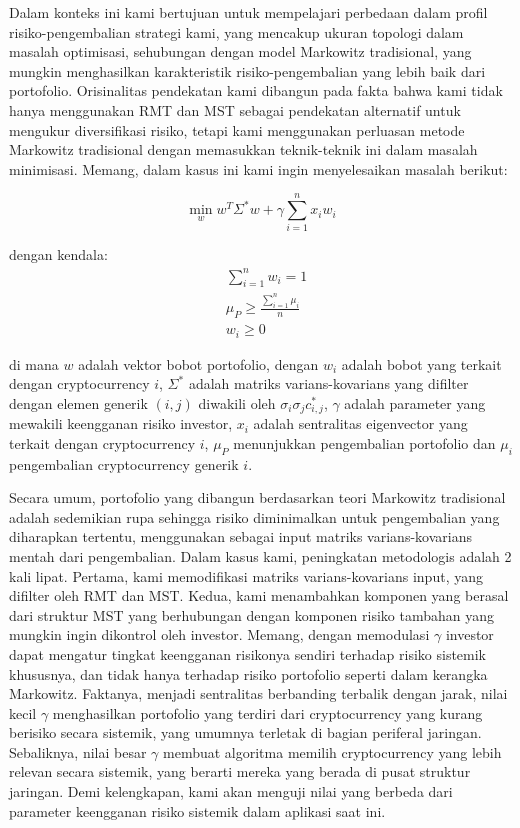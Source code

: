 \documentclass[12pt,a4paper]{article}
\begin{document}
Dalam konteks ini kami bertujuan untuk mempelajari perbedaan dalam profil risiko-pengembalian strategi kami, yang mencakup ukuran topologi dalam masalah optimisasi, sehubungan dengan model Markowitz tradisional, yang mungkin menghasilkan karakteristik risiko-pengembalian yang lebih baik dari portofolio. Orisinalitas pendekatan kami dibangun pada fakta bahwa kami tidak hanya menggunakan RMT dan MST sebagai pendekatan alternatif untuk mengukur diversifikasi risiko, tetapi kami menggunakan perluasan metode Markowitz tradisional dengan memasukkan teknik-teknik ini dalam masalah minimisasi. Memang, dalam kasus ini kami ingin menyelesaikan masalah berikut:

\begin{equation}
\min_w w^T \Sigma^* w + \gamma \sum_{i=1}^{n} x_i w_i
\end{equation}

dengan kendala:
\begin{align*}
&\sum_{i=1}^{n} w_i = 1 \\
&\mu_P \geq \frac{\sum_{i=1}^{n} \mu_i}{n} \\
&w_i \geq 0
\end{align*}

di mana $w$ adalah vektor bobot portofolio, dengan $w_i$ adalah bobot yang terkait dengan cryptocurrency $i$, $\Sigma^*$ adalah matriks varians-kovarians yang difilter dengan elemen generik $(i, j)$ diwakili oleh $\sigma_i \sigma_j c_{i,j}^*$, $\gamma$ adalah parameter yang mewakili keengganan risiko investor, $x_i$ adalah sentralitas eigenvector yang terkait dengan cryptocurrency $i$, $\mu_P$ menunjukkan pengembalian portofolio dan $\mu_i$ pengembalian cryptocurrency generik $i$.

Secara umum, portofolio yang dibangun berdasarkan teori Markowitz tradisional adalah sedemikian rupa sehingga risiko diminimalkan untuk pengembalian yang diharapkan tertentu, menggunakan sebagai input matriks varians-kovarians mentah dari pengembalian. Dalam kasus kami, peningkatan metodologis adalah 2 kali lipat. Pertama, kami memodifikasi matriks varians-kovarians input, yang difilter oleh RMT dan MST. Kedua, kami menambahkan komponen yang berasal dari struktur MST yang berhubungan dengan komponen risiko tambahan yang mungkin ingin dikontrol oleh investor. Memang, dengan memodulasi $\gamma$ investor dapat mengatur tingkat keengganan risikonya sendiri terhadap risiko sistemik khususnya, dan tidak hanya terhadap risiko portofolio seperti dalam kerangka Markowitz. Faktanya, menjadi sentralitas berbanding terbalik dengan jarak, nilai kecil $\gamma$ menghasilkan portofolio yang terdiri dari cryptocurrency yang kurang berisiko secara sistemik, yang umumnya terletak di bagian periferal jaringan. Sebaliknya, nilai besar $\gamma$ membuat algoritma memilih cryptocurrency yang lebih relevan secara sistemik, yang berarti mereka yang berada di pusat struktur jaringan. Demi kelengkapan, kami akan menguji nilai yang berbeda dari parameter keengganan risiko sistemik dalam aplikasi saat ini.
\end{document}
